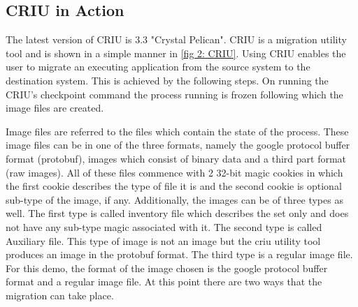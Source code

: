 \documentclass[conference]{IEEEtran}
\begin{document}
\subsection{CRIU in Action}
\label{subsec:3.1 CRIU in action}
The latest version of CRIU is 3.3 "Crystal Pelican". CRIU is a migration utility tool and is shown in a simple manner in \ref{fig 2: CRIU}. Using CRIU enables the user to migrate an executing application from the source system to the destination system. This is achieved by the following steps. On running the CRIU's checkpoint command the process running is frozen following which the image files are created. 

Image files are referred to the files which contain the state of the process. These image files can be in one of the three formats, namely the google protocol buffer format (protobuf), images which consist of binary data and a third part format (raw images). All of these files commence with 2 32-bit magic cookies in which the first cookie describes the type of file it is and the second cookie is optional sub-type of the image, if any.  Additionally, the images can be of three types as well. The first type is called inventory file which describes the set only and does not have any sub-type magic associated with it. The second type is called Auxiliary file. This type of image is not an image but the criu utility tool produces an image in the protobuf format. The third type is a regular image file.  For this demo, the format of the image chosen is the google protocol buffer format and a regular image file. At this point there are two ways that the migration can take place.
\end{document}
